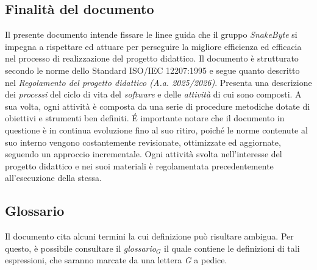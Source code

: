 \documentclass[10pt, letterpaper]{article}
\begin{document}
\subsection{Finalità del documento}
Il presente documento intende fissare le linee guida che il gruppo \textit{SnakeByte} si impegna a rispettare ed attuare per perseguire la migliore efficienza ed efficacia nel processo di realizzazione del progetto didattico.
Il documento è strutturato secondo le norme dello Standard ISO/IEC 12207:1995 e segue quanto descritto nel \textit{Regolamento del progetto didattico (A.a. 2025/2026)}. Presenta una descrizione dei \textit{processi} del ciclo di vita del \textit{software} e delle \textit{attività} di cui sono composti.
A sua volta, ogni attività è composta da una serie di procedure metodiche dotate di obiettivi e strumenti ben definiti.
\'E importante notare che il documento in questione è in continua evoluzione fino al suo ritiro, poiché le norme contenute al suo interno vengono costantemente revisionate, ottimizzate ed aggiornate, seguendo un approccio incrementale.
Ogni attività svolta nell'interesse del progetto didattico e nei suoi materiali è regolamentata precedentemente all'esecuzione della stessa.

\subsection{Glossario}
Il documento cita alcuni termini la cui definizione può risultare ambigua. Per questo, è possibile consultare il \textit{glossario$_{G}$} il quale contiene le definizioni di tali espressioni, che saranno marcate da una lettera \textit{G} a pedice.
\end{document}
